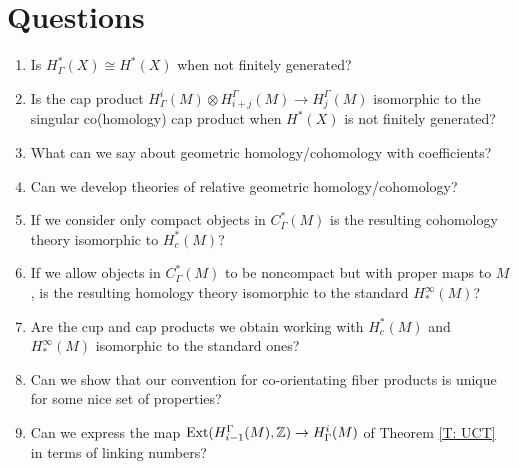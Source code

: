 
\section{Questions}

\begin{enumerate}

	\item Is $H^*_\Gamma(X)\cong H^*(X)$ when not finitely generated?

	\item Is the cap product $H^i_\Gamma(M)\otimes H_{i+j}^\Gamma(M)\to H^\Gamma_j(M)$ isomorphic to the singular co(homology) cap product when $H^*(X)$ is not finitely generated?

	\begin{comment}
		\item For a closed oriented $M^m$, is the Poincar\'e duality map $H^i_\Gamma(M)\to H_{m-i}^\Gamma(M)$ that takes a cochain to a chain simply by converting the co-orientation to an orientation (via our standard construction over oriented manifolds) isomorphic to the singular co(homology) cap product with the fundamental class via the isomorphisms of homology and cohomology groups we have developed.
	\end{comment}

	\item What can we say about geometric homology/cohomology with coefficients?

	\item Can we develop theories of relative geometric homology/cohomology?

	\item If we consider only compact objects in $C_\Gamma^*(M)$ is the resulting cohomology theory isomorphic to $H^*_c(M)$?

	\item If we allow objects in $C^*_\Gamma(M)$ to be noncompact but with proper maps to $M$, is the resulting homology theory isomorphic to the standard $H^\infty_*(M)$?

	\item Are the cup and cap products we obtain working with $H^*_c(M)$ and $H^\infty_*(M)$ isomorphic to the standard ones?

	\item Can we show that our convention for co-orientating fiber products is unique for some nice set of properties?

	\item Can we express the map $\text{Ext}(H_{i-1}^\Gamma(M),\mathbb{Z})\to H^i_\Gamma(M)$ of Theorem \ref{T: UCT} in terms of linking numbers?

\end{enumerate}